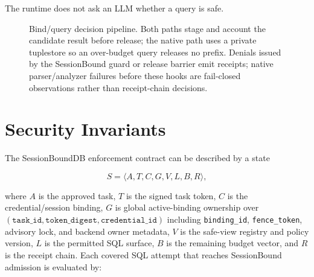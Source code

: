 \documentclass[journal]{IEEEtran}
\begin{document}
The runtime does not ask an LLM whether a query is safe.

\begin{figure}[!t]
\centering
\scriptsize
{}
\caption{Bind/query decision pipeline. Both paths stage and account the
candidate result before release; the native path uses a private tuplestore
so an over-budget query releases no prefix. Denials issued by the
SessionBound guard or release barrier emit receipts; native parser/analyzer
failures before these hooks are fail-closed observations rather than
receipt-chain decisions.}
\label{fig:bind-query-pipeline}
\end{figure}


\hypertarget{security-invariants}{%
\section{Security Invariants}\label{security-invariants}}

The SessionBoundDB enforcement contract can be described by a state

\begin{equation}
S=\langle A,T,C,G,V,L,B,R\rangle,
\end{equation}

where \(A\) is the approved task, \(T\) is the signed task token, \(C\)
is the credential/session binding, \(G\) is global active-binding ownership over
\((\texttt{task\_id},\texttt{token\_digest},\texttt{credential\_id})\)
including \texttt{binding\_id}, \texttt{fence\_token}, advisory lock,
and backend owner metadata, \(V\) is the safe-view registry and policy
version, \(L\) is the permitted SQL surface, \(B\) is the remaining
budget vector, and \(R\) is the receipt chain. Each covered SQL attempt
that reaches SessionBound admission is evaluated by:
\end{document}
